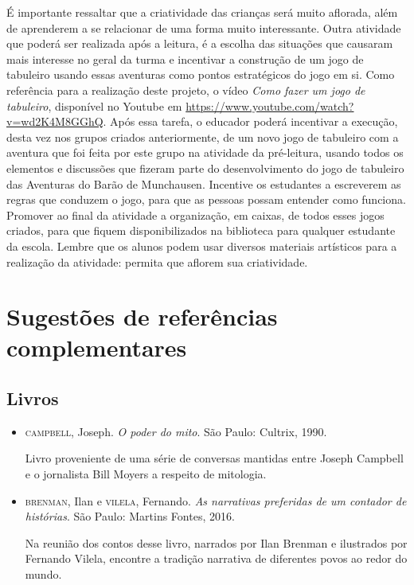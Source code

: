 \documentclass[11pt]{extarticle}
\begin{document}
É importante ressaltar que a criatividade das crianças será muito aflorada, além de aprenderem a se relacionar de uma forma muito interessante. Outra atividade que poderá ser realizada após a leitura, é a escolha das situações que causaram mais interesse no geral da turma e incentivar a construção de um jogo de tabuleiro usando essas aventuras como pontos estratégicos do jogo em si. Como referência para a realização deste projeto, o vídeo \textit{Como fazer um jogo de tabuleiro}, disponível no Youtube em \url{https://www.youtube.com/watch?v=wd2K4M8GGhQ}. Após essa tarefa, o educador poderá incentivar a execução, desta vez nos grupos criados anteriormente, de um novo jogo de tabuleiro com a aventura que foi feita por este grupo na atividade da pré-leitura, usando todos os elementos e discussões que fizeram parte do desenvolvimento do jogo de tabuleiro das Aventuras do Barão de Munchausen. Incentive os estudantes a escreverem as regras que conduzem o jogo, para que as pessoas possam entender como funciona.
Promover ao final da atividade a organização, em caixas, de todos esses jogos criados, para que fiquem disponibilizados na biblioteca para qualquer estudante da escola. Lembre que os alunos podem usar diversos materiais artísticos para a realização da atividade: permita que aflorem sua criatividade. 


\section{Sugestões de referências complementares}

\subsection{Livros} 

\begin{itemize}
\item \textsc{campbell}, Joseph. \textit{O poder do mito}. São Paulo: Cultrix, 1990.

Livro proveniente de uma série de conversas mantidas entre Joseph Campbell e o jornalista Bill Moyers a respeito de mitologia.

\item \textsc{brenman}, Ilan e \textsc{vilela}, Fernando. \textit{As narrativas preferidas de um contador de histórias}. São Paulo: Martins Fontes, 2016.

Na reunião dos contos desse livro, narrados por Ilan Brenman e ilustrados por Fernando Vilela, encontre a tradição narrativa de diferentes povos ao redor do mundo.

\end{itemize}
\end{document}
